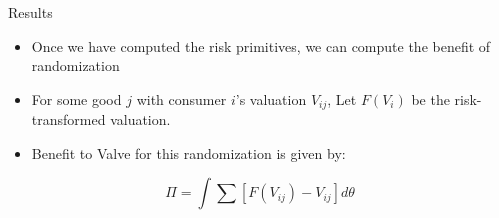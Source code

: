 \documentclass[bigger]{beamer}
\begin{document}
\begin{frame}[label={sec:org00c20aa}]{Results}
\begin{itemize}
\item Once we have computed the risk primitives, we can compute the
benefit of randomization
\item For some good \(j\) with consumer \(i\)'s valuation \(V_{ij}\), Let \(F(V_i)\)
be the risk-transformed valuation.
\item Benefit to Valve for this randomization is given by:
\end{itemize}
\begin{equation*}
\Pi = \int \sum \left[ F(V_{ij}) - V_{ij} \right] d\theta
\end{equation*}
\end{frame}
\end{document}
